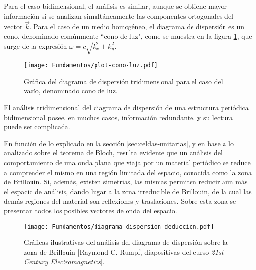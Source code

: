 Para el caso bidimensional, el análisis es similar, aunque se obtiene mayor información si se analizan simultáneamente las componentes ortogonales del vector $\vec{k}$. Para el caso de un medio homogéneo, el diagrama de dispersión es un cono, denominado comúnmente ``cono de luz", como se muestra en la figura \ref{fig:diagrama-dispersion-vacio-3d}, que surge de la expresión $\omega = c \sqrt{k_x^2 + k_y^2}$.

\begin{figure}[htp]
	\centering
	\texttt{[image: Fundamentos/plot-cono-luz.pdf]}
	\caption{Gráfica del diagrama de dispersión tridimensional para el caso del vacío, denominado cono de luz.}
	\label{fig:diagrama-dispersion-vacio-3d}
\end{figure}

El análisis tridimensional del diagrama de dispersión de una estructura periódica bidimensional posee, en muchos casos, información redundante, y su lectura puede ser complicada.

En función de lo explicado en la sección \ref{sec:celdas-unitarias}, y en base a lo analizado sobre el teorema de Bloch, resulta evidente que un análisis del comportamiento de una onda plana que viaja por un material periódico se reduce a comprender el mismo en una región limitada del espacio, conocida como la zona de Brillouin. Si, además, existen simetrías, las mismas permiten reducir aún más el espacio de análisis, dando lugar a la zona irreducible de Brillouin, de la cual las demás regiones del material son reflexiones y traslaciones. Sobre esta zona se presentan todos los posibles vectores de onda del espacio.

\begin{figure}[h]
	\centering
	\texttt{[image: Fundamentos/diagrama-dispersion-deduccion.pdf]}
	\caption{Gráficas ilustrativas del análisis del diagrama de dispersión sobre la zona de Brillouin [Raymond C. Rumpf, diapositivas del curso \textit{21st Century Electromagnetics}].}
	\label{fig:diagrama-dispersion-completo-deduccion}
\end{figure}

